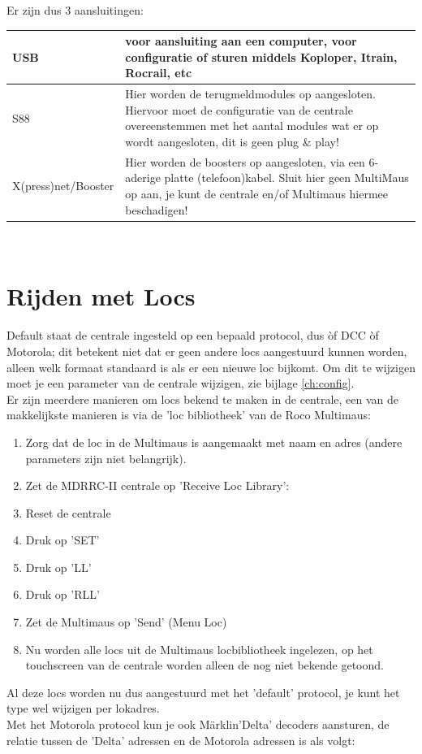 \documentclass[12pt,a4paper]{report}
\newcommand*{\marklin}{M\"{a}rklin}
\begin{document}
Er zijn dus 3 aansluitingen:\\

\begin{tabular}{|l |p{10cm}|}
\hline
USB&voor aansluiting aan een computer, voor configuratie of sturen middels Koploper, Itrain, Rocrail, etc\\
\hline
S88&Hier worden de terugmeldmodules op aangesloten. Hiervoor moet de configuratie van de centrale overeenstemmen met het aantal modules wat er op wordt aangesloten, dit is geen plug \& play!\\
\hline
X(press)net/Booster&Hier worden de boosters op aangesloten, via een 6-aderige platte (telefoon)kabel. Sluit hier geen MultiMaus op aan, je kunt de centrale en/of Multimaus hiermee beschadigen!\\
\hline
\end{tabular}\\

\section{Rijden met Locs}
Default staat de centrale ingesteld op een bepaald protocol, dus \`{o}f DCC \`{o}f Motorola; dit betekent niet dat er geen andere locs aangestuurd kunnen worden, alleen welk formaat standaard is als er een nieuwe loc bijkomt. Om dit te wijzigen moet je een parameter van de centrale wijzigen, zie bijlage \ref{ch:config}.\\
Er zijn meerdere manieren om locs bekend te maken in de centrale, een van de makkelijkste manieren is via de 'loc bibliotheek' van de Roco Multimaus:
\begin{enumerate}
\item Zorg dat de loc in de Multimaus is aangemaakt met naam en adres (andere parameters zijn niet belangrijk).
\item Zet de MDRRC-II centrale op 'Receive Loc Library': 
\item Reset de centrale
\item Druk op 'SET'
\item Druk op 'LL'
\item Druk op 'RLL'
\item Zet de Multimaus op 'Send' (Menu Loc)
\item Nu worden alle locs uit de Multimaus locbibliotheek ingelezen, op het touchscreen van de centrale worden alleen de nog niet bekende getoond.
\end{enumerate}

Al deze locs worden nu dus aangestuurd met het 'default' protocol, je kunt het type wel wijzigen per lokadres.\\
Met het Motorola protocol kun je ook \marklin 'Delta' decoders aansturen, de relatie tussen de 'Delta' adressen en de Motorola adressen is als volgt:\\
\end{document}
